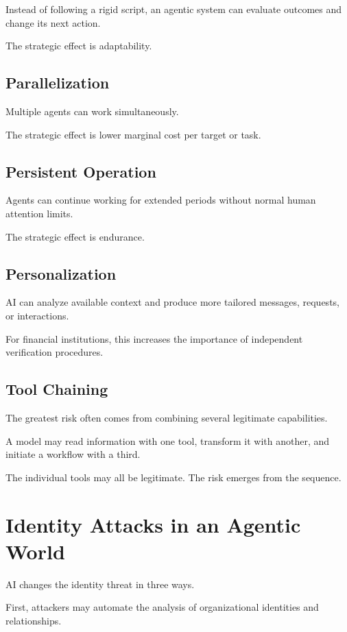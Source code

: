 Instead of following a rigid script, an agentic system can evaluate outcomes and change its next action.

The strategic effect is adaptability.

\subsection{Parallelization}

Multiple agents can work simultaneously.

The strategic effect is lower marginal cost per target or task.

\subsection{Persistent Operation}

Agents can continue working for extended periods without normal human attention limits.

The strategic effect is endurance.

\subsection{Personalization}

AI can analyze available context and produce more tailored messages, requests, or interactions.

For financial institutions, this increases the importance of independent verification procedures.

\subsection{Tool Chaining}

The greatest risk often comes from combining several legitimate capabilities.

A model may read information with one tool, transform it with another, and initiate a workflow with a third.

The individual tools may all be legitimate. The risk emerges from the sequence.

\section{Identity Attacks in an Agentic World}

AI changes the identity threat in three ways.

First, attackers may automate the analysis of organizational identities and relationships.

